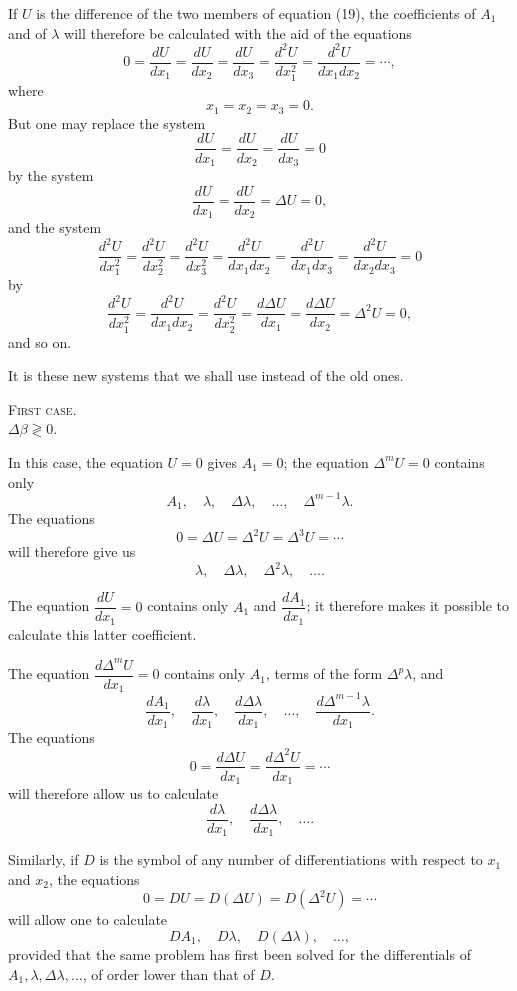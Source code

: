 \documentclass[11pt]{article}
\begin{document}
If $U$ is the difference of the two members of equation (19), the coefficients of $A_1$ and of $\lambda$ will therefore be calculated with the aid of the equations
\[
0=\frac{dU}{dx_1}=\frac{dU}{dx_2}=\frac{dU}{dx_3}
=\frac{d^2U}{dx_1^2}
=\frac{d^2U}{dx_1dx_2}
=\cdots,
\]
where
\[
x_1=x_2=x_3=0.
\]
But one may replace the system
\[
\frac{dU}{dx_1}=\frac{dU}{dx_2}=\frac{dU}{dx_3}=0
\]
by the system
\[
\frac{dU}{dx_1}=\frac{dU}{dx_2}=\Delta U=0,
\]
and the system
\[
\frac{d^2U}{dx_1^2}
=\frac{d^2U}{dx_2^2}
=\frac{d^2U}{dx_3^2}
=\frac{d^2U}{dx_1dx_2}
=\frac{d^2U}{dx_1dx_3}
=\frac{d^2U}{dx_2dx_3}=0
\]
by
\[
\frac{d^2U}{dx_1^2}
=\frac{d^2U}{dx_1dx_2}
=\frac{d^2U}{dx_2^2}
=\frac{d\Delta U}{dx_1}
=\frac{d\Delta U}{dx_2}
=\Delta^2U=0,
\]
and so on.

It is these new systems that we shall use instead of the old ones.

\begin{center}
{\scshape First case.}\\[0.3em]
$\Delta\beta\gtrless0.$
\end{center}

In this case, the equation $U=0$ gives $A_1=0$; the equation $\Delta^mU=0$ contains only
\[
A_1,\quad \lambda,\quad \Delta\lambda,\quad \ldots,\quad \Delta^{m-1}\lambda.
\]
The equations
\[
0=\Delta U=\Delta^2U=\Delta^3U=\cdots
\]
will therefore give us
\[
\lambda,\quad \Delta\lambda,\quad \Delta^2\lambda,\quad \ldots.
\]

The equation $\dfrac{dU}{dx_1}=0$ contains only $A_1$ and $\dfrac{dA_1}{dx_1}$; it therefore makes it possible to calculate this latter coefficient.

The equation $\dfrac{d\Delta^mU}{dx_1}=0$ contains only $A_1$, terms of the form $\Delta^p\lambda$, and
\[
\frac{dA_1}{dx_1},\quad
\frac{d\lambda}{dx_1},\quad
\frac{d\Delta\lambda}{dx_1},\quad
\ldots,\quad
\frac{d\Delta^{m-1}\lambda}{dx_1}.
\]
The equations
\[
0=\frac{d\Delta U}{dx_1}=\frac{d\Delta^2U}{dx_1}=\cdots
\]
will therefore allow us to calculate
\[
\frac{d\lambda}{dx_1},\quad
\frac{d\Delta\lambda}{dx_1},\quad \ldots.
\]

Similarly, if $D$ is the symbol of any number of differentiations with respect to $x_1$ and $x_2$, the equations
\[
0=DU=D(\Delta U)=D(\Delta^2U)=\cdots
\]
will allow one to calculate
\[
DA_1,\quad D\lambda,\quad D(\Delta\lambda),\quad \ldots,
\]
provided that the same problem has first been solved for the differentials of $A_1,\lambda,\Delta\lambda,\ldots$, of order lower than that of $D$.
\end{document}
